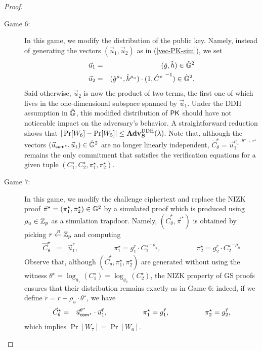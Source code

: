 \begin{proof}
\begin{description}
\item[\textsf{Game} $6$:] In this game, we modify the distribution of the public key.  Namely, instead of generating 
the vectors $(\vec{u}_1,\vec{u}_2)$ as in (\ref{vec-PK-sim}), we 
 set 
\begin{eqnarray} \label{vec-PK-sim-bis} 
 \vec{u}_1 &=& (\hat{g}, \hat{h}) \in \hat{\mathbb{G}}^2  \\ \nonumber 
 \vec{u}_2 &=&  (\hat{g}^{\rho_u}, \hat{h}^{\rho_u}) \cdot (1,{\hat{C}^\star~}^{-1})  \in \hat{\mathbb{G}}^2.
\end{eqnarray}
Said otherwise,  $\vec{u}_2$ is now the product of two terms, the first one of which lives in the 
one-dimensional subspace spanned by $\vec{u}_1$. Under the DDH assumption in $\hat{\mathbb{G}}$, this modified  
distribution of $\mathsf{PK}$ should have not noticeable impact on the adversary's behavior.  
 A straightforward reduction shows 
that $|\Pr[W_6]-\Pr[W_5] | \leq \mathbf{Adv}^{\mathrm{DDH}}_{\mathcal{B}} (\lambda)$. Note that, although the vectors $(\vec{u}_{\mathsf{com}^\star},\vec{u}_1) \in \hat{\mathbb{G}}^2$ are 
no longer linearly independent, $\vec{C}_{\theta}^\star = \vec{u}_1^{\rho_u \cdot \theta^\star +r^\star}$ remains the only commitment 
that satisfies the verification equations  for a given tuple $(C_1^\star,C_2^\star,\pi_1^\star,\pi_2^\star)$.
 

 \smallskip \smallskip 

\item[\textsf{Game} $7$:] In this game, we  modify the challenge ciphertext and replace the NIZK proof $\vec{\pi}^\star=(\pi_1^\star,\pi_2^\star) \in \mathbb{G}^2$ by a simulated proof which is produced 
using $\rho_u \in \mathbb{Z}_p$ as a simulation trapdoor. Namely, $(\vec{C}_\theta^\star,\vec{\pi}^\star)$ is obtained by picking $r \stackrel{{\scriptscriptstyle \mkern4mu R}}{\gets} \mathbb{Z}_p$ and  computing
\begin{eqnarray*}
\vec{C}_{\theta}^\star &=& \vec{u}_1^{r},   \qquad \qquad \quad
\pi_1^\star  =  g_1^{r} \cdot {C_1^\star }^{-\rho_u} , \qquad \qquad \quad 
\pi_2^\star  =  g_2^{r} \cdot {C_2^\star }^{-\rho_u}
\end{eqnarray*}
Observe that, although $(\vec{C}_\theta^\star,\pi_1^\star,\pi_2^\star)$ are generated without using the witness $\theta^\star = \log_{g_1}(C_1^\star) =
 \log_{g_2}(C_2^\star)$,  the NIZK property of 
GS proofs ensures that 
 their distribution remains exactly as in Game $6$: indeed, if we define $\tilde{r} =r -\rho_u \cdot \theta^\star$, we have
\begin{eqnarray*}
\vec{C}_{\theta}^\star &=& \vec{u}_{\mathsf{com}^\star}^{\theta^\star} \cdot \vec{u}_1^{\tilde{r}},   \qquad \qquad \quad
\pi_1^\star  =  g_1^{\tilde{r}} , \qquad \qquad \quad 
\pi_2^\star  =  g_2^{\tilde{r}} ,
\end{eqnarray*}
 which implies $\Pr[W_7]=\Pr[W_6]$.  
 \smallskip \smallskip



\end{description}
\end{proof}

